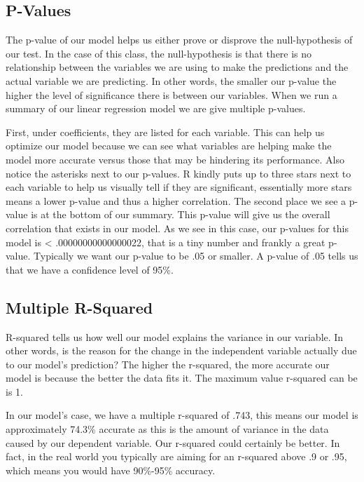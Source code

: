 \documentclass[
]{book}
\begin{document}
\hypertarget{p-values}{%
\subsection{P-Values}\label{p-values}}

The p-value of our model helps us either prove or disprove the null-hypothesis of our test. In the case of this class, the null-hypothesis is that there is no relationship between the variables we are using to make the predictions and the actual variable we are predicting. In other words, the smaller our p-value the higher the level of significance there is between our variables. When we run a summary of our linear regression model we are give multiple p-values.

First, under coefficients, they are listed for each variable. This can help us optimize our model because we can see what variables are helping make the model more accurate versus those that may be hindering its performance. Also notice the asterisks next to our p-values. R kindly puts up to three stars next to each variable to help us visually tell if they are significant, essentially more stars means a lower p-value and thus a higher correlation.
The second place we see a p-value is at the bottom of our summary. This p-value will give us the overall correlation that exists in our model. As we see in this case, our p-values for this model is \textless{} .00000000000000022, that is a tiny number and frankly a great p-value. Typically we want our p-value to be .05 or smaller. A p-value of .05 tells us that we have a confidence level of 95\%.

\hypertarget{multiple-r-squared}{%
\subsection{Multiple R-Squared}\label{multiple-r-squared}}

R-squared tells us how well our model explains the variance in our variable. In other words, is the reason for the change in the independent variable actually due to our model's prediction? The higher the r-squared, the more accurate our model is because the better the data fits it. The maximum value r-squared can be is 1.

In our model's case, we have a multiple r-squared of .743, this means our model is approximately 74.3\% accurate as this is the amount of variance in the data caused by our dependent variable. Our r-squared could certainly be better. In fact, in the real world you typically are aiming for an r-squared above .9 or .95, which means you would have 90\%-95\% accuracy.
\end{document}
